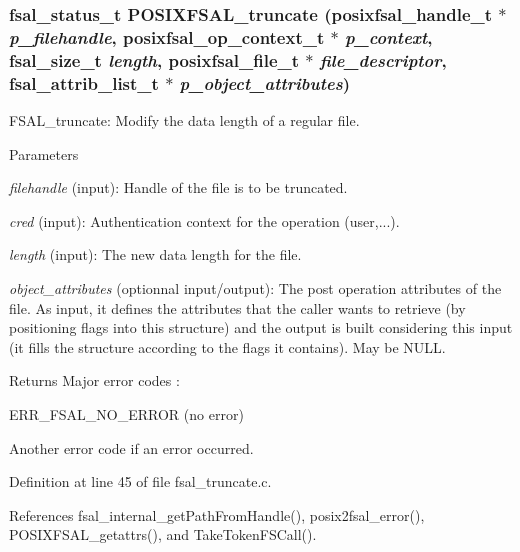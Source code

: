 \subsubsection[{POSIXFSAL\_\-truncate}]{\setlength{\rightskip}{0pt plus 5cm}fsal\_\-status\_\-t POSIXFSAL\_\-truncate (posixfsal\_\-handle\_\-t $\ast$ {\em p\_\-filehandle}, \/  posixfsal\_\-op\_\-context\_\-t $\ast$ {\em p\_\-context}, \/  fsal\_\-size\_\-t {\em length}, \/  posixfsal\_\-file\_\-t $\ast$ {\em file\_\-descriptor}, \/  fsal\_\-attrib\_\-list\_\-t $\ast$ {\em p\_\-object\_\-attributes})}\label{fsal__truncate_8c_a019893e4124eef490446c21b750970e2}
FSAL\_\-truncate: Modify the data length of a regular file.


\begin{DoxyParams}{Parameters}
\item[{\em filehandle}](input): Handle of the file is to be truncated. \item[{\em cred}](input): Authentication context for the operation (user,...). \item[{\em length}](input): The new data length for the file. \item[{\em object\_\-attributes}](optionnal input/output): The post operation attributes of the file. As input, it defines the attributes that the caller wants to retrieve (by positioning flags into this structure) and the output is built considering this input (it fills the structure according to the flags it contains). May be NULL.\end{DoxyParams}
\begin{DoxyReturn}{Returns}
Major error codes :
\begin{DoxyItemize}
\item ERR\_\-FSAL\_\-NO\_\-ERROR (no error)
\item Another error code if an error occurred. 
\end{DoxyItemize}
\end{DoxyReturn}


Definition at line 45 of file fsal\_\-truncate.c.

References fsal\_\-internal\_\-getPathFromHandle(), posix2fsal\_\-error(), POSIXFSAL\_\-getattrs(), and TakeTokenFSCall().